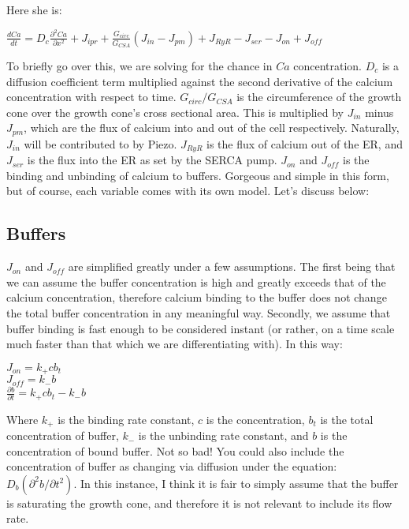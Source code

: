 \documentclass[12pt]{amsart}
\begin{document}
Here she is: 

\begin{center}

    $\frac{dCa}{dt} = D_c\frac{\partial^2 Ca}{\partial x^2} + J_{ipr} + \frac{G_{circ}}{G_{CSA}}(J_{in} - J_{pm}) + J_{RyR} - J_{ser} - J_{on} + J_{off}$

\end{center}

\bigskip

To briefly go over this, we are solving for the chance in $Ca$ concentration. $D_c$ is a diffusion coefficient term multiplied against the second derivative of the calcium concentration with respect to time. $G_{circ} / G_{CSA}$ is the circumference of the growth cone over the growth cone's cross sectional area. This is multiplied by $J_{in}$ minus $J_{pm}$, which are the flux of calcium into and out of the cell respectively. Naturally, $J_{in}$ will be contributed to by Piezo. $J_{RyR}$ is the flux of calcium out of the ER, and $J_{ser}$ is the flux into the ER as set by the SERCA pump. $J_{on}$ and $J_{off}$ is the binding and unbinding of calcium to buffers. Gorgeous and simple in this form, but of course, each variable comes with its own model. Let's discuss below: 

\subsection{Buffers} $J_{on}$ and $J_{off}$ are simplified greatly under a few assumptions. The first being that we can assume the buffer concentration is high and greatly exceeds that of the calcium concentration, therefore calcium binding to the buffer does not change the total buffer concentration in any meaningful way. Secondly, we assume that buffer binding is fast enough to be considered instant (or rather, on a time scale much faster than that which we are differentiating with). In this way:

\begin{center}

    $J_{on} = k_+cb_t$\\
    $J_{off} = k_-b$\\
    $\frac{\partial b}{\partial t} =  k_+cb_t - k_-b$
    
\end{center}
\bigskip

Where $k_+$ is the binding rate constant, $c$ is the concentration, $b_t$ is the total concentration of buffer, $k_-$ is the unbinding rate constant, and $b$ is the concentration of bound buffer. Not so bad! You could also include the concentration of buffer as changing via diffusion under the  equation: $D_b(\partial^2 b / \partial t^2)$. In this instance, I think it is fair to simply assume that the buffer is saturating the growth cone, and therefore it is not relevant to include its flow rate.\newline
\end{document}
